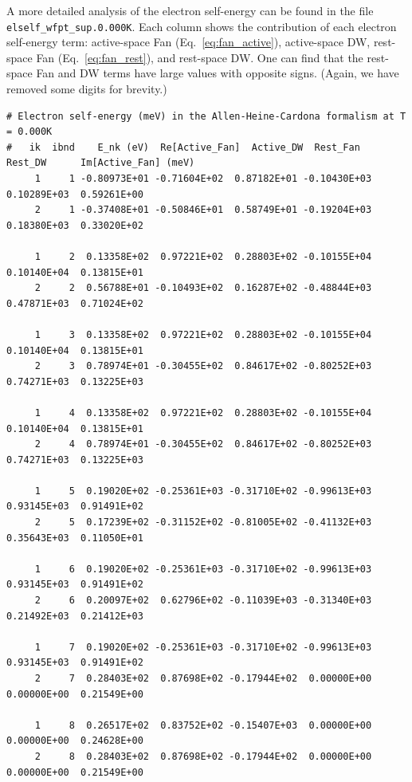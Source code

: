 \documentclass[a4paper,11pt,serif]{article}
\begin{document}
\vspace{0.2cm}
A more detailed analysis of the electron self-energy can be found in the file \texttt{elself\_wfpt\_sup.0.000K}.
Each column shows the contribution of each electron self-energy term: active-space Fan (Eq.~\eqref{eq:fan_active}), active-space DW, rest-space Fan (Eq.~\eqref{eq:fan_rest}), and rest-space DW.
One can find that the rest-space Fan and DW terms have large values with opposite signs.
(Again, we have removed some digits for brevity.)

{\color{cverb}\footnotesize
\begin{Verbatim}[commandchars=\\\{\}]
# Electron self-energy (meV) in the Allen-Heine-Cardona formalism at T = 0.000K
#   ik  ibnd    E_nk (eV)  Re[Active_Fan]  Active_DW  Rest_Fan    Rest_DW      Im[Active_Fan] (meV)
     1     1 -0.80973E+01 -0.71604E+02  0.87182E+01 -0.10430E+03  0.10289E+03  0.59261E+00
     2     1 -0.37408E+01 -0.50846E+01  0.58749E+01 -0.19204E+03  0.18380E+03  0.33020E+02

     1     2  0.13358E+02  0.97221E+02  0.28803E+02 -0.10155E+04  0.10140E+04  0.13815E+01
     2     2  0.56788E+01 -0.10493E+02  0.16287E+02 -0.48844E+03  0.47871E+03  0.71024E+02

     1     3  0.13358E+02  0.97221E+02  0.28803E+02 -0.10155E+04  0.10140E+04  0.13815E+01
     2     3  0.78974E+01 -0.30455E+02  0.84617E+02 -0.80252E+03  0.74271E+03  0.13225E+03

     1     4  0.13358E+02  0.97221E+02  0.28803E+02 -0.10155E+04  0.10140E+04  0.13815E+01
     2     4  0.78974E+01 -0.30455E+02  0.84617E+02 -0.80252E+03  0.74271E+03  0.13225E+03

     1     5  0.19020E+02 -0.25361E+03 -0.31710E+02 -0.99613E+03  0.93145E+03  0.91491E+02
     2     5  0.17239E+02 -0.31152E+02 -0.81005E+02 -0.41132E+03  0.35643E+03  0.11050E+01

     1     6  0.19020E+02 -0.25361E+03 -0.31710E+02 -0.99613E+03  0.93145E+03  0.91491E+02
     2     6  0.20097E+02  0.62796E+02 -0.11039E+03 -0.31340E+03  0.21492E+03  0.21412E+03

     1     7  0.19020E+02 -0.25361E+03 -0.31710E+02 -0.99613E+03  0.93145E+03  0.91491E+02
     2     7  0.28403E+02  0.87698E+02 -0.17944E+02  0.00000E+00  0.00000E+00  0.21549E+00

     1     8  0.26517E+02  0.83752E+02 -0.15407E+03  0.00000E+00  0.00000E+00  0.24628E+00
     2     8  0.28403E+02  0.87698E+02 -0.17944E+02  0.00000E+00  0.00000E+00  0.21549E+00
\end{Verbatim}
}
\end{document}
